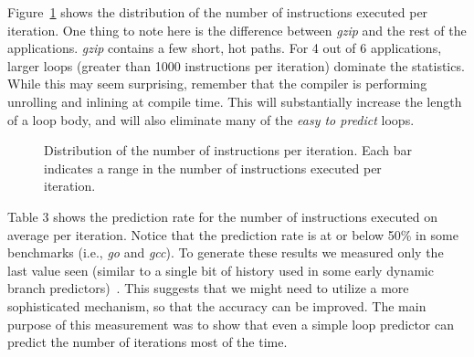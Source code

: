 \documentclass[times,10pt,twocolumn]{article}
\newcommand{\vs}{\vspace}
\begin{document}

Figure~\ref{fig:fig6} shows the distribution of the number of instructions 
executed per iteration.  One thing to note here is the difference between 
{\it gzip} and the rest of the applications.  {\it gzip} contains a 
few short, hot paths.  For 4 out of 6 applications, larger loops  
(greater than 1000 instructions per iteration) dominate the statistics.  While this
may seem surprising, remember that the compiler is performing unrolling
and inlining at compile time.  This will substantially increase the length
of a loop body, and will also eliminate many of the {\em easy to predict}
loops.

\begin{figure}
\vspace{0.2 in}
\setlength{\epsfxsize}{10cm}%
\centerline{}
\caption{Distribution of the number of instructions per iteration. Each bar
indicates a range in the number of instructions executed per iteration.}
\label{fig:fig6}
\end{figure}



Table 3 shows the prediction rate for the number of instructions executed
on average per 
iteration. Notice that the prediction rate is at or below 50\% 
in some benchmarks (i.e., {\it go} and {\it gcc}).  
To generate these results we measured  
only the last value seen (similar to a 
single bit of history used in some early dynamic branch predictors)~\cite{kaeli91}.  
This suggests that we might need to 
utilize a more sophisticated mechanism, so that the accuracy 
can be improved. The main purpose of this measurement was to show that 
even a simple loop predictor can predict the number of iterations most
of the time.
\end{document}
